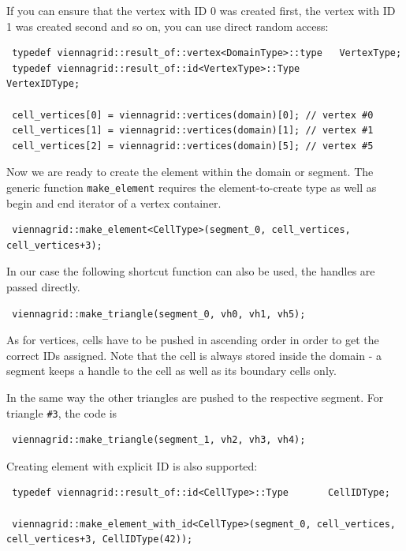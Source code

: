 If you can ensure that the vertex with ID 0 was created first, the vertex with ID 1 was created second and so on, you can use direct random access:
\begin{lstlisting}
 typedef viennagrid::result_of::vertex<DomainType>::type   VertexType;
 typedef viennagrid::result_of::id<VertexType>::Type       VertexIDType;
 
 cell_vertices[0] = viennagrid::vertices(domain)[0]; // vertex #0
 cell_vertices[1] = viennagrid::vertices(domain)[1]; // vertex #1
 cell_vertices[2] = viennagrid::vertices(domain)[5]; // vertex #5
\end{lstlisting}

Now we are ready to create the element within the domain or segment. The generic function \lstinline|make_element| requires the element-to-create type as well as begin and end iterator of a vertex container.

\begin{lstlisting}
 viennagrid::make_element<CellType>(segment_0, cell_vertices, cell_vertices+3);
\end{lstlisting}

In our case the following shortcut function can also be used, the handles are passed directly.
\begin{lstlisting}
 viennagrid::make_triangle(segment_0, vh0, vh1, vh5);
\end{lstlisting}

As for vertices, cells have to be pushed in ascending order in order to get the correct IDs assigned. Note that the cell is always stored inside the domain - a segment keeps a handle to the cell as well as its boundary cells only.

In the same way the other triangles are pushed to the respective segment. For triangle \lstinline|#3|, the code is
\begin{lstlisting}
 viennagrid::make_triangle(segment_1, vh2, vh3, vh4);
\end{lstlisting}

Creating element with explicit ID is also supported:

\begin{lstlisting}
 typedef viennagrid::result_of::id<CellType>::Type       CellIDType;
 
 viennagrid::make_element_with_id<CellType>(segment_0, cell_vertices, cell_vertices+3, CellIDType(42));
\end{lstlisting}

